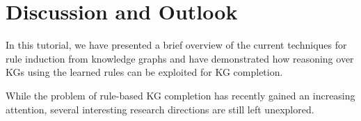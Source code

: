 \section{Discussion and Outlook}\label{sec:disc}

In this tutorial, we have presented a brief overview of the current techniques for rule induction from knowledge graphs and have demonstrated how reasoning over KGs using the learned rules  can be exploited for KG completion. %

While the problem of rule-based KG completion has recently gained an increasing attention, several interesting research directions are still left unexplored. %

